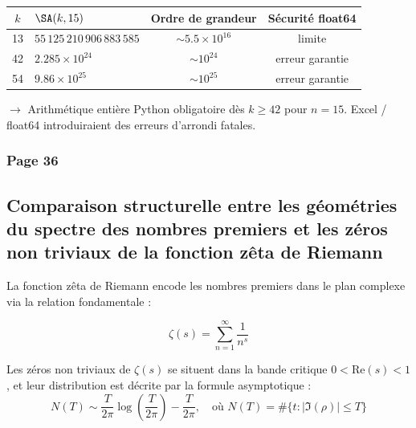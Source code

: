 \begin{boitenote}
\begin{center}
\small
\begin{tabular}{@{}clcc@{}}
\toprule
\rowcolor{spectralgris}
$k$ & $\SA(k, 15)$ & \textbf{Ordre de grandeur} & \textbf{Sécurité float64} \\
\midrule
13 & $55\,125\,210\,906\,883\,585$ & $\sim 5.5 \times 10^{16}$ & limite \\
42 & $2.285 \times 10^{24}$ & $\sim 10^{24}$ & erreur garantie \\
54 & $9.86 \times 10^{25}$ & $\sim 10^{25}$ & erreur garantie \\
\bottomrule
\end{tabular}
\end{center}
\end{boitenote}

\vspace{0.3cm}

\begin{boitealerte}
$\rightarrow$ Arithmétique entière Python obligatoire dès $k \geq 42$ pour $n=15$. Excel / float64 introduiraient des erreurs d'arrondi fatales.
\end{boitealerte}

\vspace{0.5cm}


\subsubsection*{Page 36}

\subsection*{Comparaison structurelle entre les géométries du spectre des nombres premiers et les zéros non triviaux de la fonction zêta de Riemann}

La fonction zêta de Riemann encode les nombres premiers dans le plan complexe via la relation fondamentale :

$$\zeta(s) = \sum_{n=1}^{\infty} \frac{1}{n^{s}}$$

\begin{boiteexo}
Les zéros non triviaux de $\zeta(s)$ se situent dans la bande critique $0 < \text{Re}(s) < 1$, et leur distribution est décrite par la formule asymptotique :
$$N(T) \sim \frac{T}{2\pi} \log\!\left(\frac{T}{2\pi}\right) - \frac{T}{2\pi}, \quad \text{où } N(T) = \#\{t : |\Im(\rho)| \leq T\}$$
\end{boiteexo}

